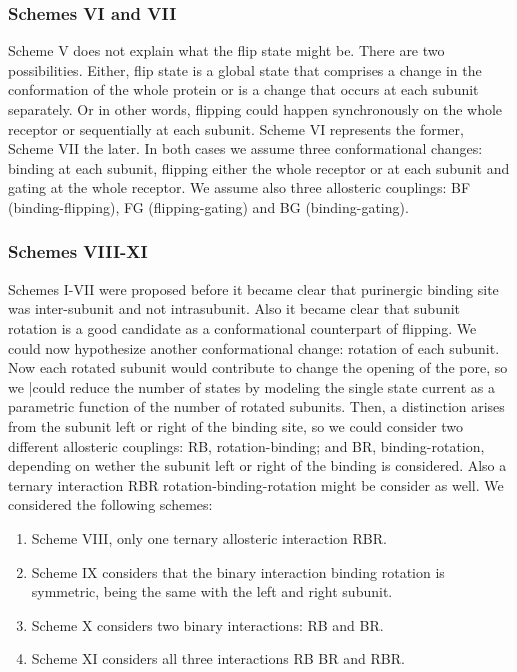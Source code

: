 \documentclass[pdflatex,sn-mathphys-num]{sn-jnl}%
\theoremstyle{thmstyleone}%
\theoremstyle{thmstyletwo}%
\theoremstyle{thmstylethree}%
\begin{document}
\subsubsection{Schemes VI and VII} 
\label{scheme67}

Scheme V does not explain what the flip state might be. There are two possibilities. Either, flip state is a global state that comprises a change in the conformation of the whole protein or is a change that occurs at each subunit separately. Or in other words, flipping could happen synchronously on the whole receptor or sequentially at each subunit. 
Scheme VI represents the former, Scheme VII the later. In both cases we assume three conformational changes: binding at each subunit, flipping either the whole receptor or at each subunit  and gating at the whole receptor. We assume also three allosteric couplings: BF (binding-flipping), FG (flipping-gating) and BG (binding-gating). 

\subsubsection{Schemes VIII-XI} 
\label{scheme811}

Schemes I-VII were proposed before it became clear that purinergic binding site was inter-subunit and not intrasubunit. Also it became clear that subunit rotation is a good candidate as a conformational counterpart of flipping. We could now hypothesize another conformational change: rotation of each subunit. Now each rotated subunit would contribute to change the opening of the pore, so we |could reduce the number of states by modeling the single state current as a parametric function of the number of rotated subunits. 
Then, a distinction arises from the subunit left or right of the binding site, so we could consider two different allosteric couplings: RB, rotation-binding; and BR, binding-rotation, depending on wether the subunit left or right of the binding is considered. Also a ternary interaction RBR rotation-binding-rotation might be consider as well. We considered the following schemes:

\begin{enumerate}
\item Scheme VIII, only one ternary allosteric interaction RBR.
\item Scheme IX considers that the binary interaction binding rotation is symmetric, being the same with the left and right subunit. 
\item Scheme X considers two binary interactions: RB and BR.
\item Scheme XI considers all three interactions RB BR and RBR. 
\end{enumerate}
\end{document}
